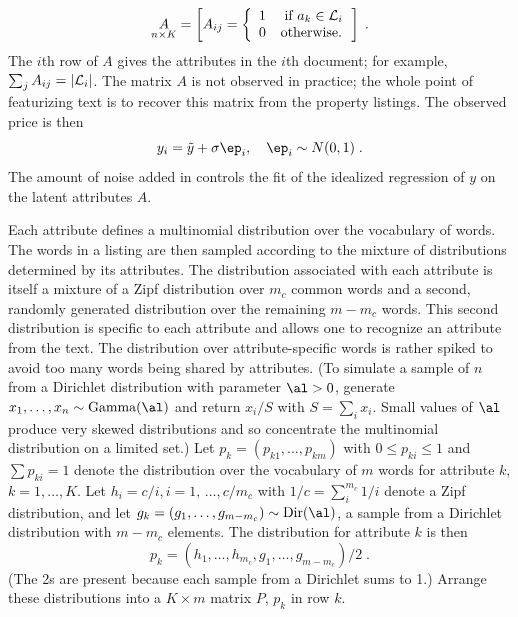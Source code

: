 \documentclass[10pt]{article}
\begin{document}
\begin{equation}
  \underset{n \times K}{A} = \left[ A_{ij} =
              \left\{ \begin{array}{cc} 1 & \mbox{ if } a_k \in {\cal L}_i \cr 0 & \mbox{otherwise.} 
                       \end{array} \right. \right]  \;.
\end{equation}
The $i$th row of $A$ gives the attributes in the $i$th document; for example, $\sum_j A_{ij} = |{\cal L}_i|$. The matrix $A$ is not observed in practice; the whole point of featurizing text is to recover this matrix from the property listings.  The observed price is then 
\begin{equation}
	y_i = \tilde{y} + \sigma \ep_i, \quad \ep_i \sim N(0,1) \;.
\label{eq:y}
\end{equation}
The amount of noise added  in  controls the fit of the idealized regression of $y$ on the latent attributes $A$.


Each attribute defines a multinomial distribution over the vocabulary of words. The words in a listing are then sampled according to the mixture of  distributions determined by its attributes. The distribution associated with each attribute is itself a mixture of a Zipf distribution over $m_c$ common words and a second, randomly generated distribution over the remaining $m-m_c$ words.   This second distribution is specific to each attribute and allows one to recognize an attribute from the text.   The distribution over attribute-specific words is rather spiked to avoid too many words being shared by attributes.  (To simulate a sample of $n$ from a Dirichlet distribution with parameter $\al>0$, generate $x_1,\ldots,x_n \sim \mbox{Gamma}(\al)$ and return $x_i/S$ with $S = \sum_i x_i$.  Small values of $\al$ produce very skewed distributions and so concentrate the multinomial distribution on a limited set.)  Let $p_{k} = (p_{k1},\ldots,p_{km})$ with $0 \le p_{ki} \le 1$ and $\sum p_{ki} = 1$ denote the distribution over the vocabulary of $m$  words for attribute $k$, $k = 1,\ldots,K$.  Let $h_i = c/i, i = 1,\, \ldots, c/m_c$ with $1/c = \sum_i^{m_c} 1/i$ denote a Zipf distribution, and let $g_k = (g_1,\ldots,g_{m-m_c}) \sim \mbox{Dir}(\al)$, a sample from a Dirichlet distribution with $m-m_c$ elements.  The distribution for attribute $k$ is then
\begin{equation}
  p_k = ( h_1, \ldots, h_{m_c},  g_1,\ldots,g_{m-m_c})/2 \;.
\end{equation}
(The 2s are present because each sample from a Dirichlet sums to 1.)  Arrange these distributions into a $K \times m$ matrix $P$, $p_k$ in row $k$.  
\end{document}
